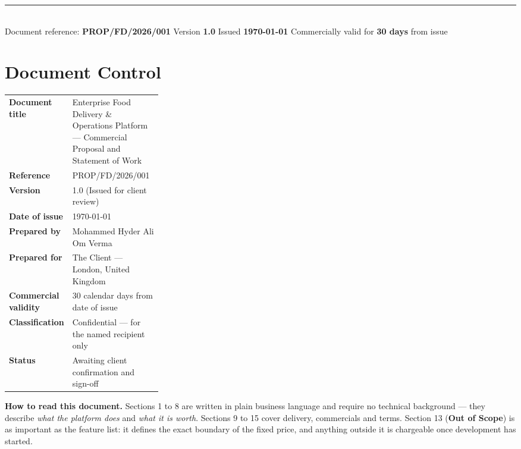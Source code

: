 \documentclass[11pt,a4paper]{article}
\begin{document}
\begin{titlepage}
\begin{minipage}[t][152mm][t]{\dimexpr\paperwidth-44mm\relax}
\vfill
{\color{brandline}\rule{\linewidth}{0.8pt}}\\[2mm]
{\color{brandgrey}\sffamily\footnotesize
Document reference: \textbf{PROP/FD/2026/001} \quad\textbullet\quad
Version \textbf{1.0} \quad\textbullet\quad
Issued \textbf{\today} \quad\textbullet\quad
Commercially valid for \textbf{30 days} from issue}

\end{minipage}

\restoregeometry
\end{titlepage}

\pagestyle{main}
\setcounter{page}{2}

\section*{\color{brandnavy}Document Control}
\vspace{-4pt}{\color{brandline}\titlerule[1.1pt]}\vspace{6pt}

\begin{tabularx}{\linewidth}{@{}L{0.30\linewidth}Y@{}}
\toprule
\textbf{Document title} & Enterprise Food Delivery \& Operations Platform --- Commercial Proposal and Statement of Work \\
\textbf{Reference} & PROP/FD/2026/001 \\
\textbf{Version} & 1.0 (Issued for client review) \\
\textbf{Date of issue} & \today \\
\textbf{Prepared by} & Mohammed Hyder Ali \textperiodcentered{} Om Verma \\
\textbf{Prepared for} & The Client --- London, United Kingdom \\
\textbf{Commercial validity} & 30 calendar days from date of issue \\
\textbf{Classification} & Confidential --- for the named recipient only \\
\textbf{Status} & Awaiting client confirmation and sign-off \\
\bottomrule
\end{tabularx}

\vspace{10pt}
\begin{keybox}
\textbf{How to read this document.} Sections 1 to 8 are written in plain business
language and require no technical background --- they describe \emph{what the platform
does} and \emph{what it is worth}. Sections 9 to 15 cover delivery, commercials and
terms. Section 13 (\textbf{Out of Scope}) is as important as the feature list: it
defines the exact boundary of the fixed price, and anything outside it is chargeable
once development has started.
\end{keybox}
\end{document}
